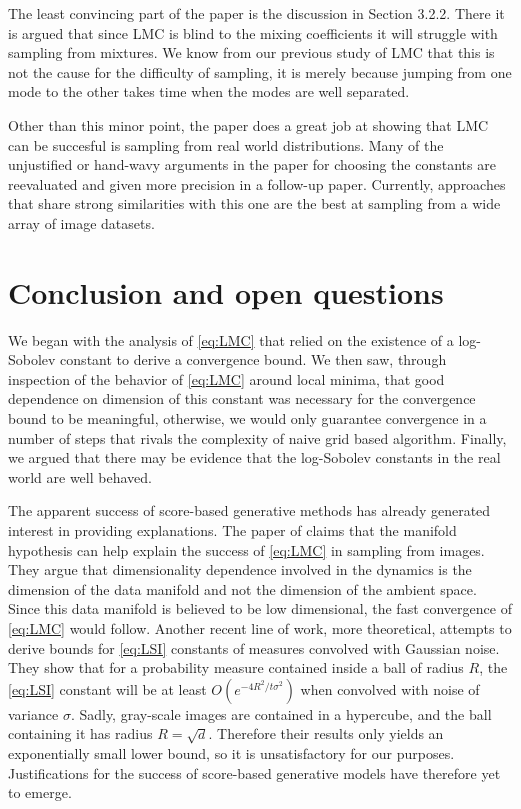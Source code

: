 \documentclass[11pt,twoside]{article}
\theoremstyle{definition}
\begin{document}
The least convincing part of the paper is the discussion in Section 3.2.2. There it is argued that since LMC is blind to the mixing coefficients it will struggle with sampling from mixtures. We know from our previous study of LMC that this is not the cause for the difficulty of sampling, it is merely because jumping from one mode to the other takes time when the modes are well separated.

Other than this minor point, the paper does a great job at showing that LMC can be succesful is sampling from real world distributions. Many of the unjustified or hand-wavy arguments in the paper for choosing the constants are reevaluated and given more precision in a follow-up paper. Currently, approaches that share strong similarities with this one are the best at sampling from a wide array of image datasets.

\section{Conclusion and open questions}

We began with the analysis of \eqref{eq:LMC} that relied on the existence of a log-Sobolev constant to derive a convergence bound. We then saw, through inspection of the behavior of \eqref{eq:LMC} around local minima, that good dependence on dimension of this constant was necessary for the convergence bound to be meaningful, otherwise, we would only guarantee convergence in a number of steps that rivals the complexity of naive grid based algorithm.  Finally, we argued that there may be evidence that the log-Sobolev constants in the real world are well behaved.

The apparent success of score-based generative methods has already generated interest in providing explanations. The paper of \cite{block_fast_2020} claims that the manifold hypothesis can help explain the success of \eqref{eq:LMC} in sampling from images. They argue that dimensionality dependence involved in the dynamics is the dimension of the data manifold and not the dimension of the ambient space. Since this data manifold is believed to be low dimensional, the fast convergence of \eqref{eq:LMC} would follow. Another recent line of work, more theoretical, attempts to derive bounds for \eqref{eq:LSI} constants of measures convolved with Gaussian noise. They show that for a probability measure contained inside a ball of radius $R$, the \eqref{eq:LSI} constant will be at least $O(e^{-4R^2/t\sigma^2})$ when convolved with noise of variance $\sigma$. Sadly, gray-scale images are contained in a hypercube, and the ball containing it has radius $R = \sqrt{d}$. Therefore their results only yields an exponentially small lower bound, so it is unsatisfactory for our purposes. Justifications for the success of score-based generative models have therefore yet to emerge.
\end{document}
